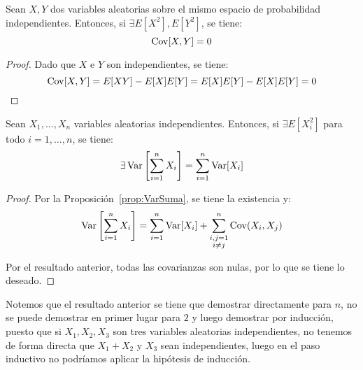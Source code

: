 \begin{coro}
    Sean $X,Y$ dos variables aleatorias sobre el mismo espacio de probabilidad independientes. Entonces, si $\exists E[X^2],E[Y^2]$, se tiene:
    \[
        \operatorname{Cov}[X,Y] = 0
    \]
\end{coro}
\begin{proof}
    Dado que $X$ e $Y$ son independientes, se tiene:
    \[
        \operatorname{Cov}[X,Y] = E[XY] - E[X]E[Y] = E[X]E[Y] - E[X]E[Y] = 0
    \]
\end{proof}

\begin{coro}
    Sean $X_1,\dots,X_n$ variables aleatorias independientes. Entonces, si $\exists E[X_i^2]$ para todo $i = 1, \ldots, n$, se tiene:
    \begin{equation*}
        \exists  \operatorname{Var}\left[\sum_{i=1}^n X_i\right] = \sum_{i=1}^n \operatorname{Var}[X_i]
    \end{equation*}
\end{coro}
\begin{proof}
    Por la Proposición~\ref{prop:VarSuma}, se tiene la existencia y:
    \begin{equation*}
        \operatorname{Var}\left[\sum_{i=1}^n X_i\right] = \sum_{i=1}^n \operatorname{Var}[X_i] + \sum_{\substack{i,j=1\\i\neq j}}^n \operatorname{Cov}(X_i,X_j)
    \end{equation*}

    Por el resultado anterior, todas las covarianzas son nulas, por lo que se tiene lo deseado.
\end{proof}

Notemos que el resultado anterior se tiene que demostrar directamente para $n$, no se puede demostrar en primer lugar para $2$ y luego demostrar por inducción, puesto que si $X_1, X_2,X_3$ son tres variables aleatorias independientes, no tenemos de forma directa que $X_1+X_2$ y $X_3$ sean independientes, luego en el paso inductivo no podríamos aplicar la hipótesis de inducción.


